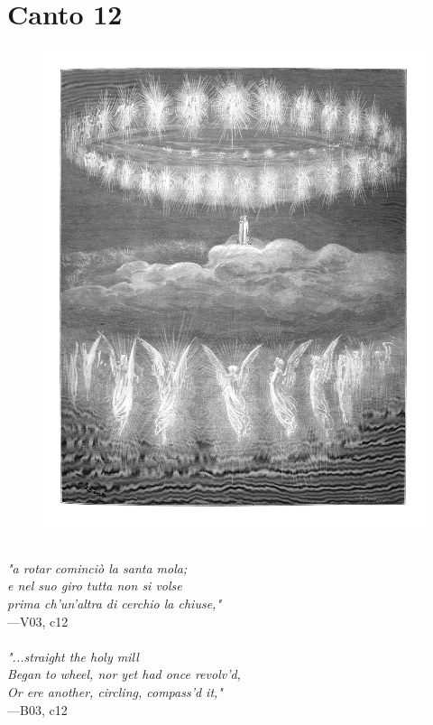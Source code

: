 \documentclass[../Dore_vision.tex]{subfiles}
\begin{document}
\newpage

\section{Canto 12}

\begin{figure}[ht]
\centering
\includegraphics[height=\figsize]{illustrations/book_3/V03, c12.jpg}
\end{figure}

\begin{center}
\begin{minipage}{0.8\linewidth}
\textit{\\
"a rotar cominciò la santa mola;\\e nel suo giro tutta non si volse\\prima ch’un’altra di cerchio la chiuse,"} \\
—V03, c12 \\~\\
\textit{"...straight the holy mill\\Began to wheel, nor yet had once revolv'd,\\Or ere another, circling, compass'd it,"} \\
—B03, c12
\end{minipage}
\end{center}
\end{document}
